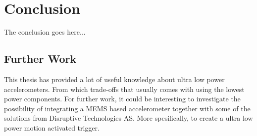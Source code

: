 \chapter{Conclusion}

The conclusion goes here...

\section{Further Work}

This thesis has provided a lot of useful knowledge about ultra low power accelerometers. From which trade-offs that usually comes with using the lowest power components. For further work, it could be interesting to investigate the possibility of integrating a MEMS based accelerometer together with some of the solutions from Disruptive Technologies AS. More spesifically, to create a ultra low power motion activated trigger.
